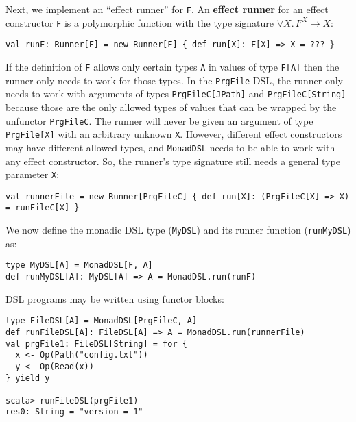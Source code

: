 Next, we implement an \textsf{``}effect runner\textsf{''} for
\lstinline!F!. An \textbf{effect
runner} for an effect constructor \lstinline!F!
is a polymorphic function with the type
signature $\forall X.\,F^{X}\rightarrow X$:
\begin{lstlisting}
val runF: Runner[F] = new Runner[F] { def run[X]: F[X] => X = ??? }
\end{lstlisting}
If the definition of \lstinline!F!
allows only certain types \lstinline!A!
in values of type \lstinline!F[A]!
then the runner only needs to work for those types. In the \lstinline!PrgFile!
DSL, the runner only needs to work with arguments of types \lstinline!PrgFileC[JPath]!
and \lstinline!PrgFileC[String]!
because those are the only allowed types of values that can be wrapped
by the unfunctor \lstinline!PrgFileC!.
The runner will never be given an argument of type \lstinline!PrgFile[X]!
with an arbitrary unknown \lstinline!X!.
However, different effect constructors may have different allowed
types, and \lstinline!MonadDSL!
needs to be able to work with any effect constructor. So, the runner\textsf{'}s
type signature still needs a general type parameter \lstinline!X!:
\begin{lstlisting}
val runnerFile = new Runner[PrgFileC] { def run[X]: (PrgFileC[X] => X) = runFileC[X] }
\end{lstlisting}
We now define the monadic DSL type (\lstinline!MyDSL!)
and its runner function (\lstinline!runMyDSL!)
as:
\begin{lstlisting}
type MyDSL[A] = MonadDSL[F, A]
def runMyDSL[A]: MyDSL[A] => A = MonadDSL.run(runF)
\end{lstlisting}
DSL programs may be written using functor blocks:
\begin{lstlisting}
type FileDSL[A] = MonadDSL[PrgFileC, A]
def runFileDSL[A]: FileDSL[A] => A = MonadDSL.run(runnerFile)
val prgFile1: FileDSL[String] = for {
  x <- Op(Path("config.txt"))
  y <- Op(Read(x))
} yield y

scala> runFileDSL(prgFile1)
res0: String = "version = 1"
\end{lstlisting}
